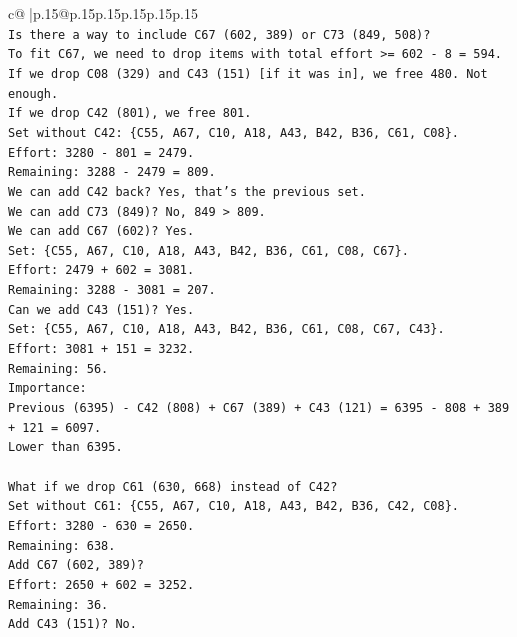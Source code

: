 \documentclass{article}
\begin{document}
{\begin{supertabular}{c@{$\;$}|p{.15\linewidth}@{}p{.15\linewidth}p{.15\linewidth}p{.15\linewidth}p{.15\linewidth}p{.15\linewidth}}
{{{\\ 
\texttt{Is there a way to include C67 (602, 389) or C73 (849, 508)?} \\
\texttt{To fit C67, we need to drop items with total effort >= 602 {-} 8 = 594.} \\
\texttt{If we drop C08 (329) and C43 (151) {[}if it was in{]}, we free 480. Not enough.} \\
\texttt{If we drop C42 (801), we free 801.} \\
\texttt{Set without C42: \{C55, A67, C10, A18, A43, B42, B36, C61, C08\}.} \\
\texttt{Effort: 3280 {-} 801 = 2479.} \\
\texttt{Remaining: 3288 {-} 2479 = 809.} \\
\texttt{We can add C42 back? Yes, that's the previous set.} \\
\texttt{We can add C73 (849)? No, 849 > 809.} \\
\texttt{We can add C67 (602)? Yes.} \\
\texttt{Set: \{C55, A67, C10, A18, A43, B42, B36, C61, C08, C67\}.} \\
\texttt{Effort: 2479 + 602 = 3081.} \\
\texttt{Remaining: 3288 {-} 3081 = 207.} \\
\texttt{Can we add C43 (151)? Yes.} \\
\texttt{Set: \{C55, A67, C10, A18, A43, B42, B36, C61, C08, C67, C43\}.} \\
\texttt{Effort: 3081 + 151 = 3232.} \\
\texttt{Remaining: 56.} \\
\texttt{Importance:} \\
\texttt{Previous (6395) {-} C42 (808) + C67 (389) + C43 (121) = 6395 {-} 808 + 389 + 121 = 6097.} \\
\texttt{Lower than 6395.} \\
\\ 
\texttt{What if we drop C61 (630, 668) instead of C42?} \\
\texttt{Set without C61: \{C55, A67, C10, A18, A43, B42, B36, C42, C08\}.} \\
\texttt{Effort: 3280 {-} 630 = 2650.} \\
\texttt{Remaining: 638.} \\
\texttt{Add C67 (602, 389)?} \\
\texttt{Effort: 2650 + 602 = 3252.} \\
\texttt{Remaining: 36.} \\
\texttt{Add C43 (151)? No.} \\
}}}
\end{supertabular}}
\end{document}
